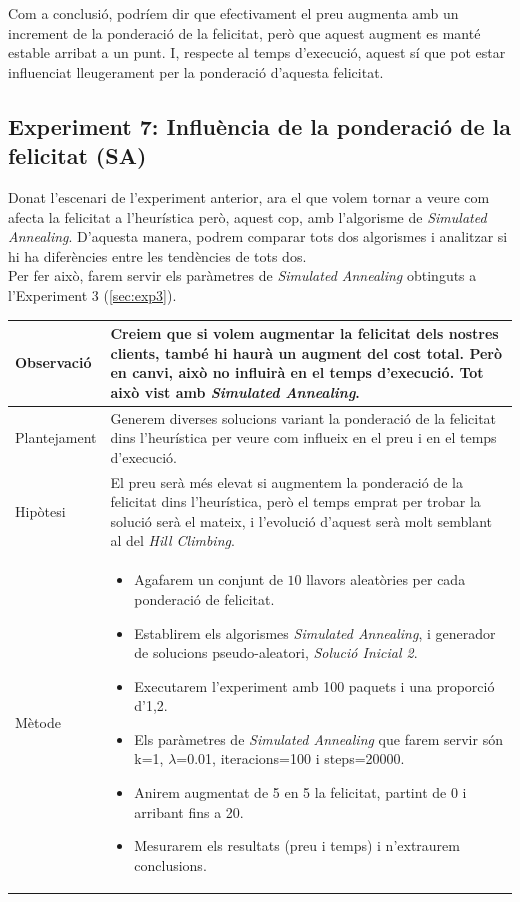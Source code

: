 \documentclass[a4paper]{article}
\begin{document}
	Com a conclusió, podríem dir que efectivament el preu augmenta amb un increment de la ponderació de la felicitat, però que aquest augment es manté estable arribat a un punt. I, respecte al temps d'execució, aquest sí que pot estar influenciat lleugerament per la ponderació d'aquesta felicitat.
	
	\subsection{Experiment 7: Influència de la ponderació de la felicitat (SA)}
	
	Donat l'escenari de l'experiment anterior, ara el que volem tornar a veure com afecta la felicitat a l'heurística però, aquest cop, amb l'algorisme de \textit{Simulated Annealing}. D'aquesta manera, podrem comparar tots dos algorismes i analitzar si hi ha diferències entre les tendències de tots dos. \\
	
	Per fer això, farem servir els paràmetres de \textit{Simulated Annealing} obtinguts a l'Experiment 3 (\ref{sec:exp3}).
	
	\begin{table}[ht]
		\centering
		\begin{tabular}{|l|p{10cm}|}
			\hline
			Observació & Creiem que si volem augmentar la felicitat dels nostres clients, també hi haurà un augment del cost total. Però en canvi, això no influirà en el temps d'execució. Tot això vist amb \textit{Simulated Annealing}. \\
			\hline
			Plantejament & Generem diverses solucions variant la ponderació de la felicitat dins l'heurística per veure com influeix en el preu i en el temps d'execució. \\
			\hline
			Hipòtesi & El preu serà més elevat si augmentem la ponderació de la felicitat dins l'heurística, però el temps emprat per trobar la solució serà el mateix, i l'evolució d'aquest serà molt semblant al del \textit{Hill Climbing}. \\
			\hline
			Mètode & 
			\begin{itemize}
				\item Agafarem un conjunt de $10$ llavors aleatòries per cada ponderació de felicitat.
				\item Establirem els algorismes \textit{Simulated Annealing}, i generador de solucions pseudo-aleatori, \textit{Solució Inicial 2}.
				\item Executarem l'experiment amb 100 paquets i una proporció d'1,2.
				\item Els paràmetres de \textit{Simulated Annealing} que farem servir són k=1, $\lambda$=0.01, iteracions=100 i steps=20000.
				\item Anirem augmentat de 5 en 5 la felicitat, partint de 0 i arribant fins a 20.
				\item Mesurarem els resultats (preu i temps) i n'extraurem conclusions.
			\end{itemize} \\
			\hline
		\end{tabular}
		\label{tab:exp7_apartats}
	\end{table}
	
\end{document}

